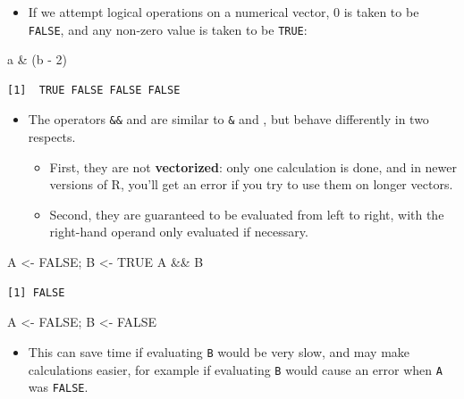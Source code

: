 \documentclass[
  9pt,
  a4paper,
  ignorenonframetext,
  notheorems]{beamer}
\newenvironment{Shaded}{\begin{snugshade}}{\end{snugshade}}
\newcommand{\ConstantTok}[1]{\textcolor[rgb]{0.56,0.35,0.01}{#1}}
\newcommand{\DecValTok}[1]{\textcolor[rgb]{0.68,0.00,0.00}{#1}}
\newcommand{\NormalTok}[1]{\textcolor[rgb]{0.00,0.23,0.31}{#1}}
\newcommand{\OtherTok}[1]{\textcolor[rgb]{0.00,0.23,0.31}{#1}}
\newcommand{\SpecialCharTok}[1]{\textcolor[rgb]{0.37,0.37,0.37}{#1}}
\providecommand{\tightlist}{%
  \setlength{\itemsep}{0pt}\setlength{\parskip}{0pt}}\usepackage{longtable,booktabs,array}
\begin{document}
\begin{frame}[fragile]
\begin{itemize}
\tightlist
\item
  If we attempt logical operations on a numerical vector, 0 is taken to
  be \texttt{FALSE}, and any non-zero value is taken to be
  \texttt{TRUE}:
\end{itemize}

\begin{Shaded}
\begin{Highlighting}[]
\NormalTok{a }\SpecialCharTok{\&}\NormalTok{ (b }\SpecialCharTok{{-}} \DecValTok{2}\NormalTok{)}
\end{Highlighting}
\end{Shaded}

\begin{verbatim}
[1]  TRUE FALSE FALSE FALSE
\end{verbatim}

\begin{itemize}
\tightlist
\item
  The operators \texttt{\&\&} and \texttt{\textbar{}\textbar{}} are
  similar to \texttt{\&} and \texttt{\textbar{}}, but behave differently
  in two respects.

  \begin{itemize}
  \tightlist
  \item
    First, they are not \textbf{vectorized}: only one calculation is
    done, and in newer versions of R, you'll get an error if you try to
    use them on longer vectors.
  \item
    Second, they are guaranteed to be evaluated from left to right, with
    the right-hand operand only evaluated if necessary.
  \end{itemize}
\end{itemize}

\begin{Shaded}
\begin{Highlighting}[]
\NormalTok{A }\OtherTok{\textless{}{-}} \ConstantTok{FALSE}\NormalTok{; B }\OtherTok{\textless{}{-}} \ConstantTok{TRUE}
\NormalTok{A }\SpecialCharTok{\&\&}\NormalTok{ B}
\end{Highlighting}
\end{Shaded}

\begin{verbatim}
[1] FALSE
\end{verbatim}

\begin{Shaded}
\begin{Highlighting}[]
\NormalTok{A }\OtherTok{\textless{}{-}} \ConstantTok{FALSE}\NormalTok{; B }\OtherTok{\textless{}{-}} \ConstantTok{FALSE}
\end{Highlighting}
\end{Shaded}

\begin{itemize}
\tightlist
\item
  This can save time if evaluating \texttt{B} would be very slow, and
  may make calculations easier, for example if evaluating \texttt{B}
  would cause an error when \texttt{A} was \texttt{FALSE}.
\end{itemize}
\end{frame}
\end{document}
